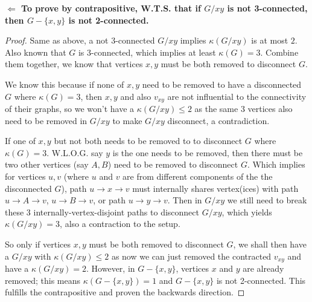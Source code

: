 \documentclass[11pt]{article}
\begin{document}
\noindent\textbf{$\Longleftarrow$ To prove by contrapositive, W.T.S. that if $G/xy$ is not 3-connected, then $G − \{x, y\}$ is not 2-connected.}

\begin{proof}

Same as above, a not 3-connected $G/xy$ implies $\kappa(G/xy)$ is at most $2$. Also known that $G$ is 3-connected, which implies at least $\kappa(G) = 3$. Combine them together, we know that vertices $x, y$ must be both removed to disconnect $G$.\newline

We know this because if none of $x, y$ need to be removed to have a disconnected $G$ where $\kappa(G) = 3$, then $x, y$ and also $v_{xy}$ are not influential to the connectivity of their graphs, so we won't have a $\kappa(G/xy) \leq 2$ as the same 3 vertices also need to be removed in $G/xy$ to make $G/xy$ disconnect, a contradiction.

If one of $x, y$ but not both needs to be removed to to disconnect $G$ where $\kappa(G) = 3$. W.L.O.G. say $y$ is the one needs to be removed, then there must be two other vertices (say $A, B$) need to be removed to disconnect $G$. Which implies for vertices $u, v$ (where $u$ and $v$ are from different components of the the disconnected $G$), path $u \to x \to v$ must internally shares vertex(ices) with path $u \to A \to v$, $u \to B \to v$, or path $u \to y \to v$. Then in $G/xy$ we still need to break these 3 internally-vertex-disjoint paths to disconnect $G/xy$, which yields $\kappa(G/xy) = 3$, also a contraction to the setup.\newline

So only if vertices $x, y$ must be both removed to disconnect $G$, we shall then have a $G/xy$ with $\kappa(G/xy) \leq 2$ as now we can just removed the contracted $v_{xy}$ and have a $\kappa(G/xy) = 2$. However, in $G - \{x, y\}$, vertices $x$ and $y$ are already removed; this means $\kappa(G - \{x, y\}) = 1$ and $G - \{x, y\}$ is not 2-connected. This fulfills the contrapositive and proven the backwards direction.

\end{proof}

%
%
%





%
% 
% 
\end{document}
